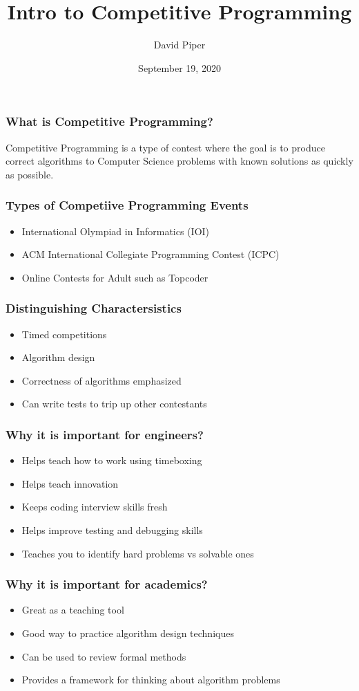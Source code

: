 \documentclass{beamer}
\title{Intro to Competitive Programming}
\author{David Piper}
\institute{Nashville Computer Science and Algorithms Meetup Group}
\date{September 19, 2020}
\begin{document}
\frame{\titlepage}

\begin{frame}
  \frametitle{What is Competitive Programming?}
  Competitive Programming is a type of contest where the goal is to produce
  correct algorithms to Computer Science problems with known solutions as quickly
  as possible.
\end{frame}

\begin{frame}
  \frametitle{Types of Competiive Programming Events}
  \begin{itemize}
    \item International Olympiad in Informatics (IOI)
    \item ACM International Collegiate Programming Contest (ICPC)
    \item Online Contests for Adult such as Topcoder
  \end{itemize}
\end{frame}

\begin{frame}
  \frametitle{Distinguishing Charactersistics}
  \begin{itemize}
    \item Timed competitions
    \item Algorithm design
    \item Correctness of algorithms emphasized
    \item Can write tests to trip up other contestants
  \end{itemize}
\end{frame}

\begin{frame}
  \frametitle{Why it is important for engineers?}
  \begin{itemize}
    \item Helps teach how to work using timeboxing
    \item Helps teach innovation
    \item Keeps coding interview skills fresh
    \item Helps improve testing and debugging skills
    \item Teaches you to identify hard problems vs solvable ones
  \end{itemize}
\end{frame}

\begin{frame}
  \frametitle{Why it is important for academics?}
  \begin{itemize}
    \item Great as a teaching tool
    \item Good way to practice algorithm design techniques
    \item Can be used to review formal methods
    \item Provides a framework for thinking about algorithm problems
  \end{itemize}
\end{frame}
\end{document}
